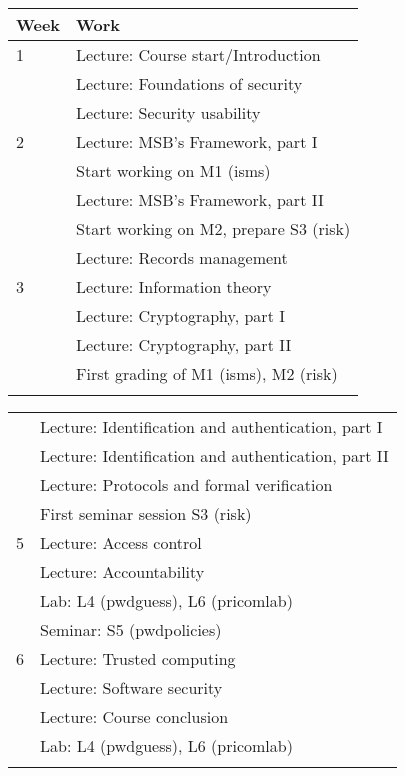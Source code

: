 	\centering
  \begin{tabular}{lp{9cm}}
    \toprule
    \textbf{Week}	& \textbf{Work} \\
    \midrule
    1
    & Lecture: Course start/Introduction\\
    & Lecture: Foundations of security\\
    & Lecture: Security usability\\
    \midrule
    2
    & Lecture: MSB's Framework, part I\\
    & Start working on M1 (isms)\\
    & Lecture: MSB's Framework, part II\\
    & Start working on M2, prepare S3 (risk)\\
    & Lecture: Records management\\
    \midrule
    3
    & Lecture: Information theory\\
    & Lecture: Cryptography, part I\\
    & Lecture: Cryptography, part II\\
    & First grading of M1 (isms), M2 (risk)\\
    \midrule
\mode<presentation>{%
  \end{tabular}
  \begin{tabular}{lp{9cm}}
}%
    4
    & Lecture: Identification and authentication, part I\\
    & Lecture: Identification and authentication, part II\\
    & Lecture: Protocols and formal verification\\
    & First seminar session S3 (risk)\\
    \midrule
    5
    & Lecture: Access control\\
    & Lecture: Accountability\\
    & Lab: L4 (pwdguess), L6 (pricomlab)\\
    & Seminar: S5 (pwdpolicies)\\
    \midrule
    6
    & Lecture: Trusted computing\\
    & Lecture: Software security\\
    & Lecture: Course conclusion\\
    & Lab: L4 (pwdguess), L6 (pricomlab)\\
    \midrule
\mode<presentation>{%
  \end{tabular}

